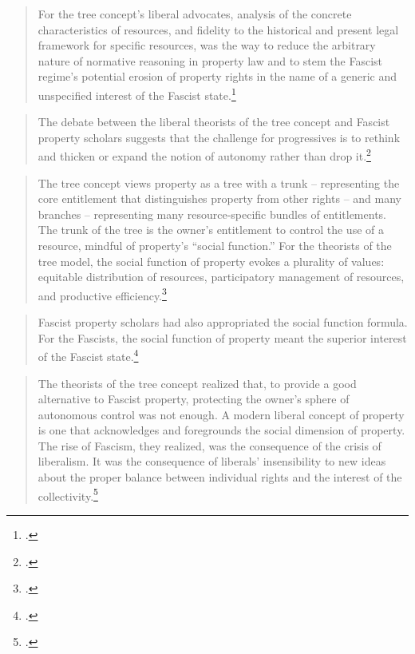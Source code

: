 \begin{quote}
For the tree concept's liberal advocates, analysis of the concrete characteristics of resources,
and fidelity to the historical and present legal framework for specific resources,
was the way to reduce the arbitrary nature of normative reasoning in property law and to stem the Fascist regime's potential erosion of property rights in the name of a generic and
unspecified interest of the Fascist state.\footcite[911-912]{robilant13}
\end{quote}

\begin{quote}
The debate between the liberal theorists of the tree concept and Fascist property
scholars suggests that the challenge for progressives is to rethink and
thicken or expand the notion of autonomy rather than drop it.\footcite[928]{robilant13}
\end{quote}

\begin{quote}
The tree concept views property as a tree with a trunk -- representing
the core entitlement that distinguishes property from other rights -- and many branches -- representing
many resource-specific bundles of entitlements. The trunk of the tree is the owner's entitlement to control the use of a resource,
mindful of property's ``social function.'' For the theorists of the tree model, the social function of property evokes a plurality of values: equitable distribution of resources, participatory management of resources, and productive efficiency.\footnote{\cite[872]{robilant13}.}
\end{quote}

\begin{quote}
Fascist property scholars had also appropriated the social function formula. For the Fascists,
the social function of property meant the superior interest of the Fascist state.\footcite[908-909]{robilant13}
\end{quote}

\begin{quote}
The theorists of the tree concept realized that,
to provide a good alternative to Fascist property, protecting the owner's sphere of
autonomous control was not enough. A modern liberal concept of
property is one that acknowledges and
foregrounds the social dimension of property. The rise of Fascism, they realized, was the
consequence of the crisis of liberalism. It was the consequence of liberals' insensibility to new ideas about the proper balance between individual rights and the interest of the collectivity.\footcite[907]{robilant13}
\end{quote}

